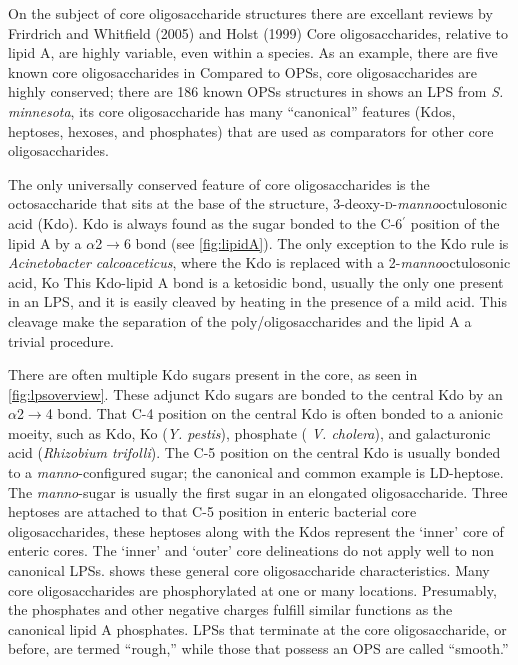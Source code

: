     On the subject of core oligosaccharide structures there are excellant reviews by Frirdrich and Whitfield (2005) and Holst (1999)
    Core oligosaccharides, relative to lipid A, are highly variable, even within a species. As an example, there are five known core oligosaccharides in \ecoli{} Compared to \acp{OPS}, core oligosaccharides are highly conserved; there are 186 known \acp{OPS} structures in \ecoli{}  shows an \ac{LPS} from \textit{S. minnesota}, its core oligosaccharide has many ``canonical'' features (\eg Kdos, heptoses, hexoses, and phosphates) that are used as comparators for other core oligosaccharides.

 The only universally conserved feature of core oligosaccharides is the octosaccharide that sits at the base of the structure, 3-deoxy-\textsc{d}-\textit{manno}octulosonic acid (Kdo). Kdo is always found as the sugar bonded to the C-6$^\prime$ position of the lipid A by a $\alpha$2$\rightarrow$6 bond (see \cref{fig:lipidA}).  The only exception to the Kdo rule is \textit{Acinetobacter calcoaceticus}, where the Kdo is replaced with a 2-\textit{manno}octulosonic acid, Ko  This Kdo-lipid A bond is a ketosidic bond, usually the only one present in an \ac{LPS}, and it is easily cleaved by heating in the presence of a mild acid. This cleavage make the separation of the poly/oligosaccharides and the lipid A a trivial procedure.

There are often multiple Kdo sugars present in the core, as seen in \cref{fig:lpsoverview}. These adjunct Kdo sugars are bonded to the central Kdo by an $\alpha$2$\rightarrow$4 bond. That C-4 position on the central Kdo is often bonded to a anionic moeity, such as Kdo, Ko (\textit{Y. pestis}), phosphate ( \textit{V. cholera}), and galacturonic acid (\textit{Rhizobium trifolli}). The C-5 position on the central Kdo is usually bonded to a \textit{manno}-configured sugar; the canonical and common example is LD-heptose. The \textit{manno}-sugar is usually the first sugar in an elongated oligosaccharide. Three heptoses are attached to that C-5 position in enteric bacterial core oligosaccharides, these heptoses along with the Kdos represent the `inner' core of enteric cores. The `inner' and `outer' core delineations do not apply well to non canonical \acp{LPS}.  shows these general core oligosaccharide characteristics. Many core oligosaccharides are phosphorylated at one or many locations. Presumably, the phosphates and other negative charges fulfill similar functions as the canonical lipid A phosphates. \Acp{LPS} that terminate at the core oligosaccharide, or before, are termed ``rough,'' while  those that possess an \ac{OPS} are called ``smooth.''

